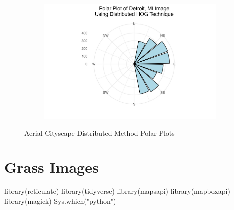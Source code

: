 \documentclass[
  letterpaper,
  DIV=11,
  numbers=noendperiod]{scrreprt}
\newenvironment{Shaded}{\begin{snugshade}}{\end{snugshade}}
\newcommand{\FunctionTok}[1]{\textcolor[rgb]{0.28,0.35,0.67}{#1}}
\newcommand{\NormalTok}[1]{\textcolor[rgb]{0.00,0.23,0.31}{#1}}
\newcommand{\StringTok}[1]{\textcolor[rgb]{0.13,0.47,0.30}{#1}}
\begin{document}
\begin{figure}
\begin{minipage}{0.33\linewidth}
\begin{figure}[H]
{}


\end{figure}%

\end{minipage}%
%
\begin{minipage}{0.33\linewidth}

\begin{figure}[H]

{\centering \includegraphics{images/plots/aerial_cities/detroit_contribution_polar_plot.jpg}

}


\end{figure}%

\end{minipage}%

\caption{\label{fig-city-distributed-polar}Aerial Cityscape Distributed
Method Polar Plots}

\end{figure}%

\chapter{Grass Images}\label{grass-images}

\begin{Shaded}
\begin{Highlighting}[]
\FunctionTok{library}\NormalTok{(reticulate)}
\FunctionTok{library}\NormalTok{(tidyverse)}
\FunctionTok{library}\NormalTok{(mapsapi)}
\FunctionTok{library}\NormalTok{(mapboxapi)}
\FunctionTok{library}\NormalTok{(magick)}
\FunctionTok{Sys.which}\NormalTok{(}\StringTok{"python"}\NormalTok{)}
\end{Highlighting}
\end{Shaded}
\end{document}
